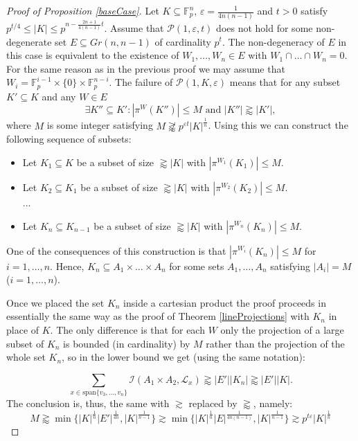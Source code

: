 \documentclass{amsart}
\newcommand{\F}{\mathbb F}
\begin{document}
\begin{proof}[Proof of Proposition \ref{baseCase}]
Let $K \subseteq \F_p^n$, $\varepsilon = \frac{1}{4n(n - 1)}$ and $t > 0$ satisfy $p^{t/4} \leq |K| \leq p^{n - \frac{2n + 1}{4(n - 1)}t}$. Assume that $\mathcal{P}(1, \varepsilon, t)$ does not hold for some non-degenerate set $E \subseteq Gr(n, n - 1)$ of cardinality $p^t$. The non-degeneracy of $E$ in this case is equivalent to the existence of $W_1, \ldots, W_n \in E$ with $W_1 \cap \ldots \cap W_n = 0$. For the same reason as in the previous proof we may assume that $W_i = \F_p^{i -1} \times \{0\} \times \F_p^{n - i}$. The failure of $\mathcal{P}(1, K, \varepsilon)$ means that  for any subset $K' \subseteq K$ and any $W \in E$ 
$$ \exists K'' \subseteq K' : |\pi^W(K'')| \leq M \text{ and } |K''| \gtrapprox|K'|,$$ where $M$ is some integer satisfying $M \not \gtrapprox p^{\varepsilon t}|K|^\frac{1}{n}$. Using this we can construct the following sequence of subsets: 
\begin{itemize}
    \item Let $K_1 \subseteq K$ be a subset of size $\gtrapprox |K|$ with $|\pi^{W_1}(K_1)| \leq M$.
    \item Let $K_2 \subseteq K_1$ be a subset of size $\gtrapprox |K|$ with $|\pi^{W_2}(K_2)| \leq M$. \\
    ...
    \item Let $K_n \subseteq K_{n - 1}$ be a subset of size $\gtrapprox |K|$ with $|\pi^{W_n}(K_n)| \leq M$.
\end{itemize}
One of the consequences of this construction is that $|\pi^{W_i}(K_n)| \leq M$ for $i = 1, \ldots, n$. Hence, $K_n \subseteq A_1 \times \ldots \times A_n$ for some sets $A_1, \ldots, A_n$ satisfying $|A_i| = M$ ($i = 1, \ldots, n$). 

Once we placed the set $K_n$ inside a cartesian product the proof proceeds in essentially the same way as the proof of Theorem \ref{lineProjections} with $K_n$ in place of $K$. The only difference is that for each $W$ only the projection of a large subset of $K_n$ is bounded (in cardinality) by $M$ rather than the projection of the whole set $K_n$, so in the lower bound we get (using the same notation):

$$\sum_{x \in \text{span}\{v_3, \ldots, v_n\}} \mathcal{I}(A_1 \times A_2, \mathcal{L}_x) \gtrapprox |E'| |K_n| \gtrapprox |E'||K|.$$
The conclusion is, thus, the same with $\gtrsim$ replaced by $\gtrapprox$, namely:
    $$M \gtrapprox \min\{|K|^\frac{1}{n}|E'|^\frac{1}{4n}, |K|^\frac{1}{n - 1}\} \gtrsim \min\{|K|^\frac{1}{n}|E|^\frac{1}{4n(n - 1)}, |K|^\frac{1}{n - 1}\} \gtrsim p^{t \varepsilon} |K|^\frac{1}{n}$$
\end{proof}
\end{document}
